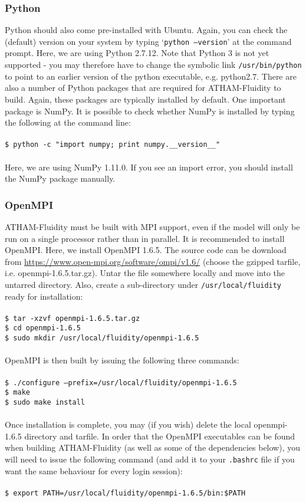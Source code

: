 \documentclass[10pt,a4paper]{article}
\newcommand\tab[1][0.5cm]{\hspace*{#1}}
\begin{document}
\subsubsection{Python}
Python should also come pre-installed with Ubuntu. Again, you can check the (default) version on your system by typing `\texttt{python --version}' at the command prompt. Here, we are using Python 2.7.12. Note that Python 3 is not yet supported - you may therefore have to change the symbolic link \texttt{/usr/bin/python} to point to an earlier version of the python executable, e.g. python2.7. There are also a number of Python packages that are required for ATHAM-Fluidity to build. Again, these packages are typically installed by default. One important package is NumPy. It is possible to check whether NumPy is installed by typing the following at the command line:\\\\
\tab \texttt{\$ python -c "import numpy; print numpy.\_\_version\_\_"}\\\\
Here, we are using NumPy 1.11.0. If you see an import error, you should install the NumPy package manually.

\subsubsection{OpenMPI}
ATHAM-Fluidity must be built with MPI support, even if the model will only be run on a single processor rather than in parallel. It is recommended to install OpenMPI. Here, we install OpenMPI 1.6.5. The source code can be download from \url{https://www.open-mpi.org/software/ompi/v1.6/} (choose the gzipped tarfile, i.e. openmpi-1.6.5.tar.gz). Untar the file somewhere locally and move into the untarred directory. Also, create a sub-directory under \texttt{/usr/local/fluidity} ready for installation:\\\\
\tab \texttt{\$ tar -xzvf openmpi-1.6.5.tar.gz}\\
\tab \texttt{\$ cd openmpi-1.6.5}\\
\tab \texttt{\$ sudo mkdir /usr/local/fluidity/openmpi-1.6.5}\\\\
OpenMPI is then built by issuing the following three commands:\\\\
\tab \texttt{\$ ./configure --prefix=/usr/local/fluidity/openmpi-1.6.5}\\
\tab \texttt{\$ make}\\
\tab \texttt{\$ sudo make install}\\\\
Once installation is complete, you may (if you wish) delete the local openmpi-1.6.5 directory and tarfile. In order that the OpenMPI executables can be found when building ATHAM-Fluidity (as well as some of the dependencies below), you will need to issue the following command (and add it to your \texttt{.bashrc} file if you want the same behaviour for every login session):\\\\
\tab \texttt{\$ export PATH=/usr/local/fluidity/openmpi-1.6.5/bin:\$PATH}
\end{document}
